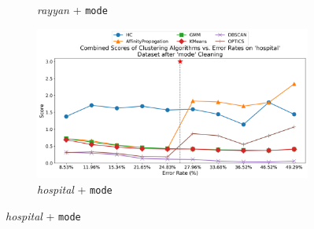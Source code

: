 \documentclass[10pt]{article} %
\numberwithin{equation}{section}
\begin{document}
\begin{figure}[htbp]
\begin{subfigure}{0.24\linewidth}
    \caption{\textit{rayyan} + \texttt{mode}}
    \label{fig:mode_rayyan}
  \end{subfigure}
  \hfill
  \begin{subfigure}{0.24\linewidth}
    \centering
    \includegraphics[width=\linewidth]{mode_hospital_combined_scores.png}
    \caption{\textit{hospital} + \texttt{mode}}
    \label{fig:mode_hospital}
  \end{subfigure}

  \vspace{1em} %


\end{figure}
\end{document}
